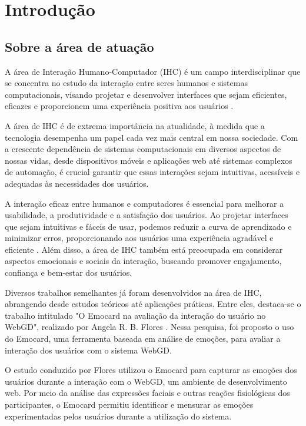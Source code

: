 \chapter{Introdução}

\section{Sobre a área de atuação}

A área de Interação Humano-Computador (IHC) é um campo interdisciplinar que se concentra no estudo da interação entre seres humanos e sistemas computacionais, visando projetar e desenvolver interfaces que sejam eficientes, eficazes e proporcionem uma experiência positiva aos usuários \cite{1}.

A área de IHC é de extrema importância na atualidade, à medida que a tecnologia desempenha um papel cada vez mais central em nossa sociedade. Com a crescente dependência de sistemas computacionais em diversos aspectos de nossas vidas, desde dispositivos móveis e aplicações web até sistemas complexos de automação, é crucial garantir que essas interações sejam intuitivas, acessíveis e adequadas às necessidades dos usuários.

A interação eficaz entre humanos e computadores é essencial para melhorar a usabilidade, a produtividade e a satisfação dos usuários. Ao projetar interfaces que sejam intuitivas e fáceis de usar, podemos reduzir a curva de aprendizado e minimizar erros, proporcionando aos usuários uma experiência agradável e eficiente \cite{2}. Além disso, a área de IHC também está preocupada em considerar aspectos emocionais e sociais da interação, buscando promover engajamento, confiança e bem-estar dos usuários.

Diversos trabalhos semelhantes já foram desenvolvidos na área de IHC, abrangendo desde estudos teóricos até aplicações práticas. Entre eles, destaca-se o trabalho intitulado "O Emocard na avaliação da interação do usuário no WebGD", realizado por Angela R. B. Flores \cite{3}. Nessa pesquisa, foi proposto o uso do Emocard, uma ferramenta baseada em análise de emoções, para avaliar a interação dos usuários com o sistema WebGD.

O estudo conduzido por Flores utilizou o Emocard para capturar as emoções dos usuários durante a interação com o WebGD, um ambiente de desenvolvimento web. Por meio da análise das expressões faciais e outras reações fisiológicas dos participantes, o Emocard permitiu identificar e mensurar as emoções experimentadas pelos usuários durante a utilização do sistema.

